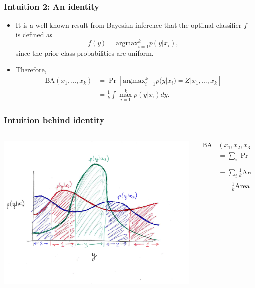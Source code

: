 \documentclass{beamer}
\begin{document}
\begin{frame}
\frametitle{Intuition 2: An identity}
\begin{itemize}
\item It is a well-known result from Bayesian inference that the optimal classifier $f$ is defined as
\[
f(y) = \text{argmax}_{i=1}^k p(y|x_i),
\]
since the prior class probabilities are uniform.
\item Therefore,
\begin{align*}
\text{BA}(x_1,...,x_k) &= \Pr[\text{argmax}_{i=1}^k p(y|x_i) = Z| x_1,...,x_k] 
\\&= \frac{1}{k}\int \max_{i=1}^k p(y|x_i) dy.
\end{align*}
\end{itemize}
\end{frame}

\begin{frame}
\frametitle{Intuition behind identity}
\begin{columns}
\begin{column}{0.5\textwidth}
\begin{center}
\includegraphics[scale = 0.35, clip = true, trim = 1.2in 1.3in 0in 1in]{var_ba.png}
\end{center}   
\end{column}
\begin{column}{0.5\textwidth}  %
\begin{align*}
\text{BA}&(x_1,x_2,x_3) \\&= \sum_i \Pr[x_i]\Pr_{Y \sim p(y|x_i)}[Y \in \text{zone }i]
\\&= \sum_i \frac{1}{k} \text{Area under curve $i$ in zone $i$}
\\&\ \ \ = \frac{1}{k} \text{Area under } \max_{i=1}^k p(y|x_i)
\end{align*}
\end{column}
\end{columns}
\end{frame}
\end{document}
